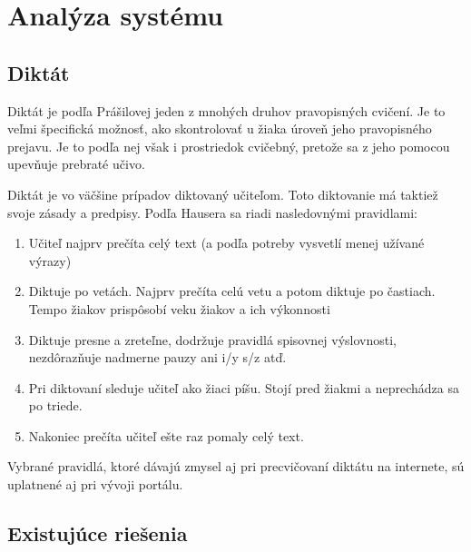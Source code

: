 \documentclass[12pt,oneside]{fithesis2}
\begin{document}
    \chapter{Analýza systému}
       \section{Diktát}
	\par Diktát je podľa Prášilovej\cite{prasilova14} jeden z mnohých druhov pravopisných cvičení. Je to veľmi špecifická možnosť, ako skontrolovať u žiaka úroveň jeho pravopisného prejavu. Je to podľa nej však i prostriedok cvičebný, pretože sa z jeho pomocou upevňuje prebraté učivo. 
	\par Diktát je vo väčšine prípadov diktovaný učiteľom. Toto diktovanie má taktiež svoje zásady a predpisy. Podľa Hausera\cite{hauser94} sa riadi nasledovnými pravidlami:
	      \begin{enumerate}
	\item Učiteľ najprv prečíta celý text (a podľa potreby vysvetlí menej užívané výrazy)
	\item Diktuje po vetách. Najprv prečíta celú vetu a potom diktuje po častiach. Tempo žiakov prispôsobí veku žiakov a ich výkonnosti
	\item Diktuje presne a zreteľne, dodržuje pravidlá spisovnej výslovnosti, nezdôrazňuje nadmerne pauzy ani i/y s/z atď.
	\item Pri diktovaní sleduje učiteľ ako žiaci píšu. Stojí pred žiakmi a neprechádza sa po triede.
	\item Nakoniec prečíta učiteľ ešte raz pomaly celý text.
\end{enumerate}

\par Vybrané pravidlá, ktoré dávajú zmysel aj pri precvičovaní diktátu na internete, sú uplatnené aj pri vývoji portálu.
	

       \section{Existujúce riešenia}       
\end{document}
